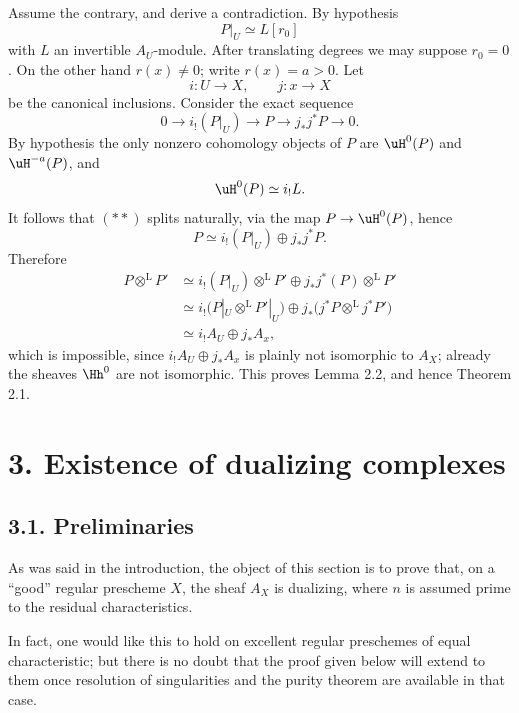 \begin{prooftext}
Assume the contrary, and derive a contradiction. By hypothesis
\[
   P|_U\simeq L[r_0]
\]
with $L$ an invertible $A_U$-module. After translating degrees we may suppose $r_0=0$. On the other hand $r(x)\ne0$; write $r(x)=a>0$. Let
\[
   i:U\to X,
   \qquad
   j:x\to X
\]
be the canonical inclusions. Consider the exact sequence
\begin{equation}
0\longrightarrow i_!(P|_U)\longrightarrow P\longrightarrow j_*j^*P\longrightarrow0.\tag{**}
\end{equation}
By hypothesis the only nonzero cohomology objects of $P$ are $\uH^0(P)$ and $\uH^{-a}(P)$, and
\[
   \uH^0(P)\simeq i_!L.
\]
It follows that $(**)$ splits naturally, via the map $P\to\uH^0(P)$, hence
\[
   P\simeq i_!(P|_U)\oplus j_*j^*P.
\]
Therefore
\begin{align*}
P\otimes^{\mathrm L}P'
&\simeq i_!(P|_U)\otimes^{\mathrm L}P'
      \oplus j_*j^*(P)\otimes^{\mathrm L}P' \\
&\simeq i_!\bigl(P|_U\otimes^{\mathrm L}P'|_U\bigr)
      \oplus j_*\bigl(j^*P\otimes^{\mathrm L}j^*P'\bigr)\\
&\simeq i_!A_U\oplus j_*A_x,
\end{align*}
which is impossible, since $i_!A_U\oplus j_*A_x$ is plainly not isomorphic to $A_X$; already the sheaves $\Hh^0$ are not isomorphic. This proves Lemma 2.2, and hence Theorem 2.1. \qedtext
\end{prooftext}

\section*{3. Existence of dualizing complexes}

\subsection*{3.1. Preliminaries}

As was said in the introduction, the object of this section is to prove that, on a ``good'' regular prescheme $X$, the sheaf $A_X$ is dualizing, where $n$ is assumed prime to the residual characteristics.

In fact, one would like this to hold on excellent regular preschemes of equal characteristic; but there is no doubt that the proof given below will extend to them once resolution of singularities and the purity theorem are available in that case.

